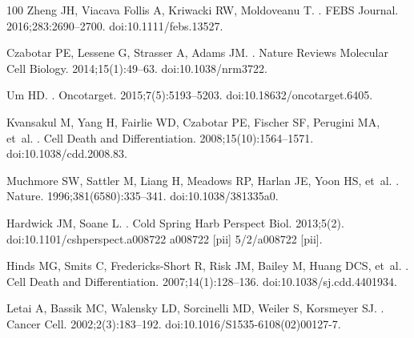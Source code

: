 \documentclass[10pt,letterpaper]{article}
\begin{document}
\begin{thebibliography}{100}
Zheng JH, {Viacava Follis} A, Kriwacki RW, Moldoveanu T.
.
\newblock FEBS Journal. 2016;283:2690--2700.
\newblock doi:{10.1111/febs.13527}.

Czabotar PE, Lessene G, Strasser A, Adams JM.
.
\newblock Nature Reviews Molecular Cell Biology. 2014;15(1):49--63.
\newblock doi:{10.1038/nrm3722}.

Um HD.
.
\newblock Oncotarget. 2015;7(5):5193--5203.
\newblock doi:{10.18632/oncotarget.6405}.

Kvansakul M, Yang H, Fairlie WD, Czabotar PE, Fischer SF, Perugini MA, et~al.
.
\newblock Cell Death and Differentiation. 2008;15(10):1564--1571.
\newblock doi:{10.1038/cdd.2008.83}.

Muchmore SW, Sattler M, Liang H, Meadows RP, Harlan JE, Yoon HS, et~al.
.
\newblock Nature. 1996;381(6580):335--341.
\newblock doi:{10.1038/381335a0}.

Hardwick JM, Soane L.
.
\newblock Cold Spring Harb Perspect Biol. 2013;5(2).
\newblock doi:{10.1101/cshperspect.a008722 a008722 [pii] 5/2/a008722 [pii]}.

Hinds MG, Smits C, Fredericks-Short R, Risk JM, Bailey M, Huang DCS, et~al.
.
\newblock Cell Death and Differentiation. 2007;14(1):128--136.
\newblock doi:{10.1038/sj.cdd.4401934}.

Letai A, Bassik MC, Walensky LD, Sorcinelli MD, Weiler S, Korsmeyer SJ.
.
\newblock Cancer Cell. 2002;2(3):183--192.
\newblock doi:{10.1016/S1535-6108(02)00127-7}.


\end{thebibliography}
\end{document}
